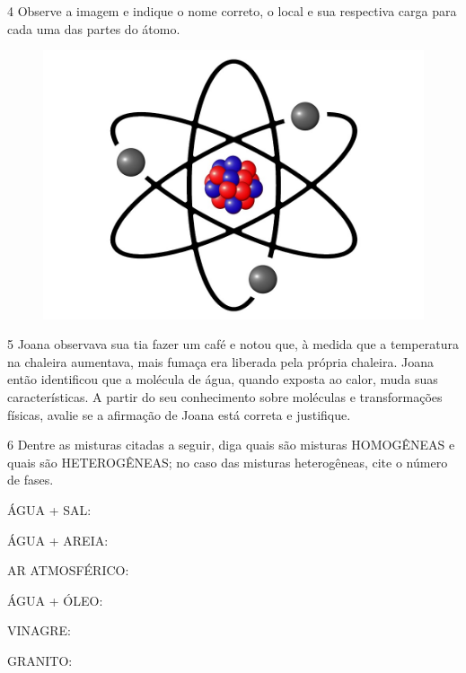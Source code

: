 \num{4}  Observe a imagem e indique o nome correto, o local e sua respectiva
  carga para cada uma das partes do átomo.

\begin{figure}[htpb!]
\centering
\includegraphics[width=.5\textwidth]{./imgs/img7.jpg}
\end{figure}


\num{5} Joana observava sua tia fazer um café e notou que, à medida que a temperatura na chaleira aumentava, mais fumaça era liberada pela própria chaleira. Joana então identificou que a molécula de água, quando exposta ao calor, muda suas características. A partir do seu conhecimento sobre moléculas e transformações físicas, avalie se a afirmação de Joana está correta e justifique.
  


\num{6} Dentre as misturas citadas a
  seguir, diga quais são misturas HOMOGÊNEAS e quais são HETEROGÊNEAS; no caso das
  misturas heterogêneas, cite o número de fases.

\begin{escolha}
\item
  ÁGUA + SAL: 
\item
  ÁGUA + AREIA: 
\item
  AR ATMOSFÉRICO: 
\item
  ÁGUA + ÓLEO: 
\item
  VINAGRE: 
\item
  GRANITO: 
\end{escolha}

